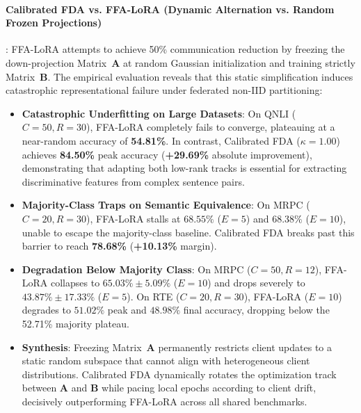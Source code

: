 \documentclass[10pt,a4paper]{article}
\begin{document}
\paragraph{Calibrated FDA vs. FFA-LoRA (Dynamic Alternation vs. Random Frozen Projections)}:
FFA-LoRA attempts to achieve 50\% communication reduction by freezing the down-projection Matrix~$\mathbf{A}$ at random Gaussian initialization and training strictly Matrix~$\mathbf{B}$.
The empirical evaluation reveals that this static simplification induces catastrophic representational failure under federated non-IID partitioning:
\begin{itemize}
    \item \textbf{Catastrophic Underfitting on Large Datasets}: On QNLI ($C=50, R=30$), FFA-LoRA completely fails to converge, plateauing at a near-random accuracy of \textbf{54.81\%}. In contrast, Calibrated FDA ($\kappa=1.00$) achieves \textbf{84.50\%} peak accuracy (\textbf{+29.69\%} absolute improvement), demonstrating that adapting both low-rank tracks is essential for extracting discriminative features from complex sentence pairs.
    \item \textbf{Majority-Class Traps on Semantic Equivalence}: On MRPC ($C=20, R=30$), FFA-LoRA stalls at $68.55\%$ ($E=5$) and $68.38\%$ ($E=10$), unable to escape the majority-class baseline. Calibrated FDA breaks past this barrier to reach \textbf{78.68\%} (\textbf{+10.13\%} margin).
    \item \textbf{Degradation Below Majority Class}: On MRPC ($C=50, R=12$), FFA-LoRA collapses to $65.03\% \pm 5.09\%$ ($E=10$) and drops severely to $43.87\% \pm 17.33\%$ ($E=5$). On RTE ($C=20, R=30$), FFA-LoRA ($E=10$) degrades to $51.02\%$ peak and $48.98\%$ final accuracy, dropping below the 52.71\% majority plateau.
    \item \textbf{Synthesis}: Freezing Matrix~$\mathbf{A}$ permanently restricts client updates to a static random subspace that cannot align with heterogeneous client distributions. Calibrated FDA dynamically rotates the optimization track between $\mathbf{A}$ and $\mathbf{B}$ while pacing local epochs according to client drift, decisively outperforming FFA-LoRA across all shared benchmarks.
\end{itemize}
\end{document}
